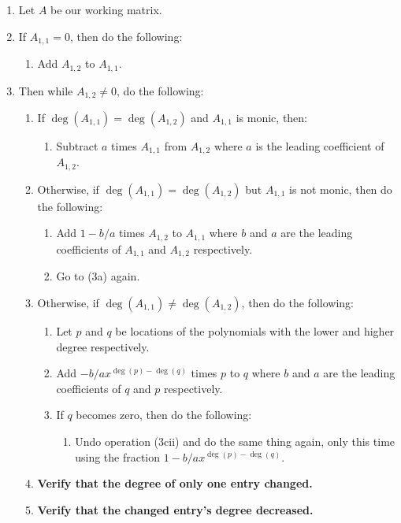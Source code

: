 \documentclass[twocolumn]{article}
\begin{document}
			\begin{enumerate}
				\item Let $A$ be our working matrix.
				\item If $A_{1,1}=0$, then do the following:
				\begin{enumerate}
					\item Add $A_{1,2}$ to $A_{1,1}$.
				\end{enumerate}
				\item Then while $A_{1,2}\ne 0$, do the following:
				\begin{enumerate}
					\item If $\deg(A_{1,1})=\deg(A_{1,2})$ and $A_{1,1}$ is monic, then:
					\begin{enumerate}
						\item Subtract $a$ times $A_{1,1}$ from $A_{1,2}$ where $a$ is the leading coefficient of $A_{1,2}$.
					\end{enumerate}
					\item Otherwise, if $\deg(A_{1,1})=\deg(A_{1,2})$ but $A_{1,1}$ is not monic, then do the following:
					\begin{enumerate}
						\item Add $1-b/a$ times $A_{1,2}$ to $A_{1,1}$ where $b$ and $a$ are the leading coefficients of $A_{1,1}$ and $A_{1,2}$ respectively.
						\item Go to (3a) again.
					\end{enumerate}
					\item Otherwise, if $\deg(A_{1,1})\ne\deg(A_{1,2})$, then do the following:
					\begin{enumerate}
						\item Let $p$ and $q$ be locations of the polynomials with the lower and higher degree respectively.
						\item Add $-b/ax^{\deg(p)-\deg(q)}$ times $p$ to $q$ where $b$ and $a$ are the leading coefficients of $q$ and $p$ respectively.
						\item If $q$ becomes zero, then do the following:
						\begin{enumerate}
							\item Undo operation (3cii) and do the same thing again, only this time using the fraction $1-b/ax^{\deg(p)-\deg(q)}$.
						\end{enumerate}
					\end{enumerate}
					\item \textbf{Verify that the degree of only one entry changed.}
					\item \textbf{Verify that the changed entry's degree decreased.}

\end{enumerate}
\end{enumerate}
\end{document}
